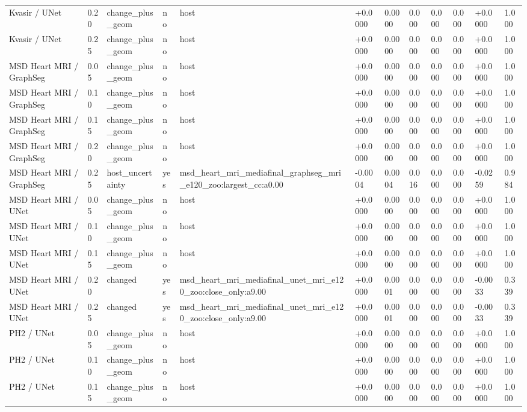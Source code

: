 \begin{table}[t]
\begin{tabular}{llllllllllll}
Kvasir / UNet & 0.20 & change\_plus\_geom & no & host & +0.0000 & 0.0000 & 0.000 & 0.000 & 0.000 & +0.0000 & 1.000 \\
Kvasir / UNet & 0.25 & change\_plus\_geom & no & host & +0.0000 & 0.0000 & 0.000 & 0.000 & 0.000 & +0.0000 & 1.000 \\
MSD Heart MRI / GraphSeg & 0.05 & change\_plus\_geom & no & host & +0.0000 & 0.0000 & 0.000 & 0.000 & 0.000 & +0.0000 & 1.000 \\
MSD Heart MRI / GraphSeg & 0.10 & change\_plus\_geom & no & host & +0.0000 & 0.0000 & 0.000 & 0.000 & 0.000 & +0.0000 & 1.000 \\
MSD Heart MRI / GraphSeg & 0.15 & change\_plus\_geom & no & host & +0.0000 & 0.0000 & 0.000 & 0.000 & 0.000 & +0.0000 & 1.000 \\
MSD Heart MRI / GraphSeg & 0.20 & change\_plus\_geom & no & host & +0.0000 & 0.0000 & 0.000 & 0.000 & 0.000 & +0.0000 & 1.000 \\
MSD Heart MRI / GraphSeg & 0.25 & host\_uncertainty & yes & msd\_heart\_mri\_mediafinal\_graphseg\_mri\_e120\_zoo:largest\_cc:a0.00 & -0.0004 & 0.0004 & 0.016 & 0.000 & 0.000 & -0.0259 & 0.984 \\
MSD Heart MRI / UNet & 0.05 & change\_plus\_geom & no & host & +0.0000 & 0.0000 & 0.000 & 0.000 & 0.000 & +0.0000 & 1.000 \\
MSD Heart MRI / UNet & 0.10 & change\_plus\_geom & no & host & +0.0000 & 0.0000 & 0.000 & 0.000 & 0.000 & +0.0000 & 1.000 \\
MSD Heart MRI / UNet & 0.15 & change\_plus\_geom & no & host & +0.0000 & 0.0000 & 0.000 & 0.000 & 0.000 & +0.0000 & 1.000 \\
MSD Heart MRI / UNet & 0.20 & changed & yes & msd\_heart\_mri\_mediafinal\_unet\_mri\_e120\_zoo:close\_only:a9.00 & +0.0000 & 0.0001 & 0.000 & 0.000 & 0.000 & -0.0033 & 0.339 \\
MSD Heart MRI / UNet & 0.25 & changed & yes & msd\_heart\_mri\_mediafinal\_unet\_mri\_e120\_zoo:close\_only:a9.00 & +0.0000 & 0.0001 & 0.000 & 0.000 & 0.000 & -0.0033 & 0.339 \\
PH2 / UNet & 0.05 & change\_plus\_geom & no & host & +0.0000 & 0.0000 & 0.000 & 0.000 & 0.000 & +0.0000 & 1.000 \\
PH2 / UNet & 0.10 & change\_plus\_geom & no & host & +0.0000 & 0.0000 & 0.000 & 0.000 & 0.000 & +0.0000 & 1.000 \\
PH2 / UNet & 0.15 & change\_plus\_geom & no & host & +0.0000 & 0.0000 & 0.000 & 0.000 & 0.000 & +0.0000 & 1.000 \\

\end{tabular}
\end{table}
